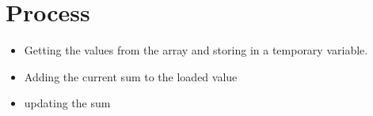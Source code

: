 \section*{Process}
\begin{itemize}
    \item Getting the values from the array and storing in a temporary variable.  
    \item Adding the current sum to the loaded value
    \item updating the sum
\end{itemize}
